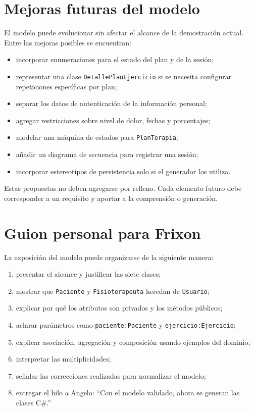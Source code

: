 \section{Mejoras futuras del modelo}
El modelo puede evolucionar sin afectar el alcance de la demostración actual. Entre las mejoras posibles se encuentran:
\begin{itemize}
  \item incorporar enumeraciones para el estado del plan y de la sesión;
  \item representar una clase \texttt{DetallePlanEjercicio} si se necesita configurar repeticiones específicas por plan;
  \item separar los datos de autenticación de la información personal;
  \item agregar restricciones sobre nivel de dolor, fechas y porcentajes;
  \item modelar una máquina de estados para \texttt{PlanTerapia};
  \item añadir un diagrama de secuencia para registrar una sesión;
  \item incorporar estereotipos de persistencia solo si el generador los utiliza.
\end{itemize}

Estas propuestas no deben agregarse por relleno. Cada elemento futuro debe corresponder a un requisito y aportar a la comprensión o generación.

\section{Guion personal para Frixon}
La exposición del modelo puede organizarse de la siguiente manera:
\begin{enumerate}
  \item presentar el alcance y justificar las siete clases;
  \item mostrar que \texttt{Paciente} y \texttt{Fisioterapeuta} heredan de \texttt{Usuario};
  \item explicar por qué los atributos son privados y los métodos públicos;
  \item aclarar parámetros como \texttt{paciente:Paciente} y \texttt{ejercicio:Ejercicio};
  \item explicar asociación, agregación y composición usando ejemplos del dominio;
  \item interpretar las multiplicidades;
  \item señalar las correcciones realizadas para normalizar el modelo;
  \item entregar el hilo a Angelo: ``Con el modelo validado, ahora se generan las clases C\#.''
\end{enumerate}

